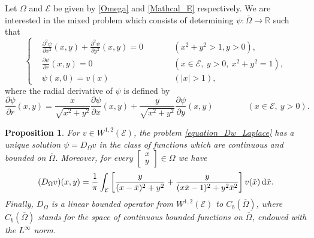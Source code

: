 \documentclass{amsart} %
\numberwithin{equation}{section}
\newtheorem{proposition}[theorem]{Proposition}
\theoremstyle{definition}
\begin{document}
Let $\Omega$ and $\mathcal{E}$ be given by \eqref{Omega} and \eqref{Mathcal_E} respectively. We are interested in the mixed problem which consists of determining $\psi:\overline\Omega\to \mathbb{R}$ such that
\begin{equation}\label{equation_Dw_Laplace}
\left\{
\begin{aligned}
&\frac{\partial^2\psi}{\partial x^2}(x,y) + \frac{\partial^2\psi}{\partial y^2}(x,y) =0 && \qquad(x^2+y^2>1, y>0),\\
&\frac{\partial\psi}{\partial r}(x,y)=0 && \qquad (x\in \mathcal{E},\ y>0,\ x^2+y^2=1),\\
&\psi(x,0)=v(x) &&\qquad (|x|>1),
\end{aligned}
\right.
\end{equation}
where the radial derivative of $\psi$ is defined by
\begin{equation}
\frac{\partial\psi}{\partial r}(x,y)=\frac{x}{\sqrt{x^2+y^2}}\frac{\partial\psi}{\partial x}(x,y)
+ \frac{y}{\sqrt{x^2+y^2}}\frac{\partial\psi}{\partial y}(x,y)\qquad\qquad (x\in \mathcal{E},\ y>0).
\end{equation}

\begin{proposition}\label{21}
For  $v\in W^{1,2}(\mathcal{E})$, the problem \eqref{equation_Dw_Laplace} has a unique solution $\psi=D_\Omega v$ in the class of functions which are continuous and bounded on $\overline\Omega$. Moreover,
  for every  $\begin{bmatrix} x\\ y\end{bmatrix}\in \Omega$  we have
\begin{equation}\label{explicit_formula_Dv}
    (D_\Omega v)(x,y)=
    \frac{1}{\pi}\int_{\mathcal{E}}\left[\frac{y}{( x-\tilde x)^2+y^2}+\frac{y}{(x\tilde x-1)^2+y^2\tilde x^2}\right]v(\tilde x)\,{\rm d}\tilde x .
\end{equation}
Finally, $D_\Omega$ is a linear bounded operator from $W^{1,2}(\mathcal{E})$ to $C_b(\overline\Omega)$, where $C_b(\overline{\Omega})$
stands for the space of continuous bounded functions on $\overline{\Omega}$, endowed with the $L^\infty$ norm.
\end{proposition}
\end{document}
